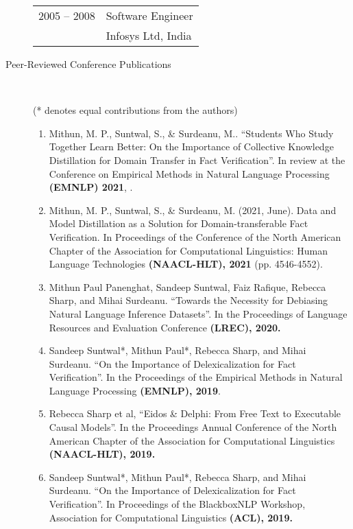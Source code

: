 \documentclass[10pt]{article}
\newcommand{\ti}[1]{``#1''} %
\begin{document}
\begin{description}
\begin{tabular}{lp{4.9in}}
\hspace{-.2cm}2005 -- 2008 & Software Engineer	\\
& {\sc Infosys Ltd, India} 

\end{tabular}







\item [ Peer-Reviewed Conference Publications]\


(* denotes equal contributions from the authors)

\begin{enumerate}

\item Mithun, M. P., Suntwal, S., \& Surdeanu, M..   \ti{Students Who Study Together Learn Better: On the Importance of Collective Knowledge Distillation for Domain Transfer in Fact Verification}. In review at  the Conference on Empirical Methods in Natural Language Processing \textbf{(EMNLP) 2021}, .


\item Mithun, M. P., Suntwal, S., \& Surdeanu, M. (2021, June). Data and Model Distillation as a Solution for Domain-transferable Fact Verification. In Proceedings of the Conference of the North American Chapter of the Association for Computational Linguistics: Human Language Technologies \textbf{(NAACL-HLT), 2021} (pp. 4546-4552).

\item Mithun Paul Panenghat, Sandeep Suntwal, Faiz Rafique, Rebecca Sharp, and Mihai Surdeanu.   \ti{Towards the Necessity for Debiasing Natural Language Inference Datasets}.  In the Proceedings of Language Resources and Evaluation Conference \textbf{(LREC), 2020.}


\item Sandeep Suntwal*, Mithun Paul*, Rebecca Sharp, and Mihai Surdeanu.   \ti{On the Importance of Delexicalization for Fact Verification}. In the Proceedings of the Empirical Methods in Natural Language Processing \textbf{(EMNLP), 2019}.

\item  Rebecca Sharp et al,   \ti{Eidos \& Delphi: From Free Text to Executable Causal Models}. In the Proceedings Annual Conference of the North American Chapter of the Association for Computational Linguistics \textbf{(NAACL-HLT), 2019.}


\item Sandeep Suntwal*, Mithun Paul*, Rebecca Sharp, and Mihai Surdeanu.   \ti{On the Importance of Delexicalization for Fact Verification}. In Proceedings of the BlackboxNLP Workshop, Association for Computational Linguistics \textbf{(ACL), 2019.}


\end{enumerate}
\end{description}
\end{document}

